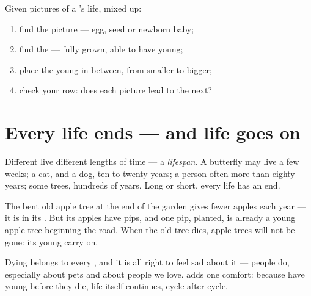 \begin{method}\label{met:g2:born-grow-die:order}
Given pictures of a 's life, mixed up:
\begin{enumerate}
  \item find the  picture --- egg, seed or newborn baby;
  \item find the  --- fully grown, able to have young;
  \item place the young in between, from smaller to bigger;
  \item check your row: does each picture lead to the next?
\end{enumerate}
\end{method}

\section{Every life ends --- and life goes on}

\begin{proposition}[Lifespans]\label{prop:g2:born-grow-die:lifespan}
Different  live different lengths of time --- a
\emph{lifespan}. A butterfly may live a few weeks;
a cat, and a dog, ten to twenty years; a person often more than
eighty years; some trees, hundreds of years. Long or short, every
life has an end.
\end{proposition}
\admitted

\begin{example}\label{ex:g2:born-grow-die:oldtree}
The bent old apple tree at the end of the garden gives fewer
apples each year --- it is in its . But its apples have
pips, and one pip, planted, is already a young apple tree
beginning the road. When the old tree dies, apple trees will not
be gone: its young carry on.
\end{example}

\begin{remark}\label{rem:g2:born-grow-die:death}
Dying belongs to every , and it is all right to feel sad
about it --- people do, especially about pets and about people we
love.  adds one comfort: because  have young before
they die, life itself continues, cycle after cycle.
\end{remark}

